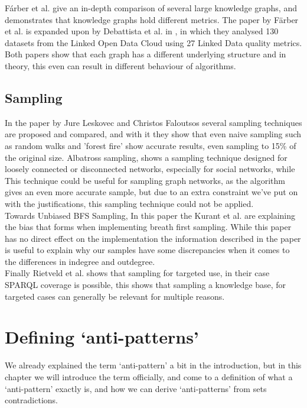 \documentclass{article}
\begin{document}
F\'arber et al. \cite{MichaelF:2017} give an in-depth comparison of several large knowledge graphs, and demonstrates that knowledge graphs hold different metrics. The paper by F\"arber et al. \cite{MichaelF:2017} is expanded upon by Debattista et al. in \cite{Debattista:2018}, in which they analysed 130 datasets from the Linked Open Data Cloud using 27 Linked Data quality metrics. Both papers show that each graph has a different underlying structure and in theory, this even can result in different behaviour of algorithms.

\subsection{Sampling}
In the paper by Jure Leskovec and Christos Faloutsos \cite{Leskovec:2006} several sampling techniques are proposed and compared, and with it they show that even naive sampling such as random walks and 'forest fire' show accurate results, even sampling to 15\% of the original size. 
\cite{Jin:2011} Albatross sampling, shows a sampling technique designed for loosely connected or disconnected networks, especially for social networks, while
This technique could be useful for sampling graph networks, as the algorithm gives an even more accurate sample, but due to an extra constraint we've put on with the justifications, this sampling technique could not be applied.\\

\cite{Kurant:2011} Towards Unbiased BFS Sampling, In this paper the Kurant et al. are explaining the bias that forms when implementing breath first sampling.
While this paper has no direct effect on the implementation the information described in the paper is useful to explain why our samples have some discrepancies when it comes to the differences in indegree and outdegree. \\

Finally Rietveld et al.\cite{Rietveld:2014} shows that sampling for targeted use, in their case SPARQL coverage is possible, this shows that sampling a knowledge base, for targeted cases can generally be relevant for multiple reasons.


\newpage
\section{Defining `anti-patterns'}\label{AntiPatternDefinition}
 We already explained the term  `anti-pattern' a bit in the introduction, but in this chapter we will introduce the term officially, and come to a definition of what a `anti-pattern' exactly is, and how we can derive `anti-patterns' from sets contradictions. \\
 
\end{document}
